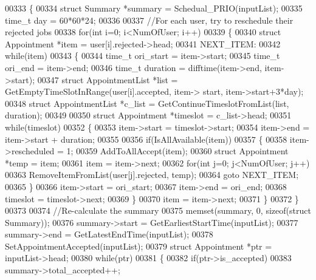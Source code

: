\begin{DoxyCode}
00333 \{
00334     \textcolor{keyword}{struct }Summary *summary = Schedual_PRIO(inputList);
00335     time\_t day = 60*60*24;
00336 
00337     \textcolor{comment}{//For each user, try to reschedule their rejected jobs}
00338     \textcolor{keywordflow}{for}(\textcolor{keywordtype}{int} i=0; i<NumOfUser; i++)
00339     \{
00340         \textcolor{keyword}{struct }Appointment *item = user[i].rejected->head;
00341         NEXT\_ITEM:
00342         \textcolor{keywordflow}{while}(item)
00343         \{
00344             time\_t ori\_start = item->start;
00345             time\_t ori\_end = item->end;
00346             time\_t duration = difftime(item->end, item->start);
00347             \textcolor{keyword}{struct }AppointmentList *list = GetEmptyTimeSlotInRange(user[i].accepted, item->
      start, item->start+3*day);
00348             \textcolor{keyword}{struct }AppointmentList *c\_list = GetContinueTimeslotFromList(list, duration);
00349 
00350             \textcolor{keyword}{struct }Appointment *timeslot = c\_list->head;
00351             \textcolor{keywordflow}{while}(timeslot)
00352             \{
00353                 item->start = timeslot->start;
00354                 item->end = item->start + duration;
00355 
00356                 \textcolor{keywordflow}{if}(IsAllAvailable(item))
00357                 \{
00358                     item->rescheduled = 1;
00359                     AddToAllAccept(item);
00360                     \textcolor{keyword}{struct }Appointment *temp = item;
00361                     item = item->next;
00362                     \textcolor{keywordflow}{for}(\textcolor{keywordtype}{int} j=0; j<NumOfUser; j++)
00363                         RemoveItemFromList(user[j].rejected, temp);
00364                     \textcolor{keywordflow}{goto} NEXT\_ITEM;
00365                 \}
00366                 item->start = ori\_start;
00367                 item->end = ori\_end;
00368                 timeslot = timeslot->next;
00369             \}
00370             item = item->next;
00371         \}
00372     \}
00373 
00374     \textcolor{comment}{//Re-calculate the summary}
00375     memset(summary, 0, \textcolor{keyword}{sizeof}(\textcolor{keyword}{struct} Summary));
00376     summary->start = GetEarliestStartTime(inputList);
00377     summary->end = GetLatestEndTime(inputList);
00378     SetAppointmentAccepted(inputList);
00379     \textcolor{keyword}{struct }Appointment *ptr = inputList->head;
00380     \textcolor{keywordflow}{while}(ptr)
00381     \{
00382         \textcolor{keywordflow}{if}(ptr->is_accepted)
00383             summary->total_accepted++;

\end{DoxyCode}
